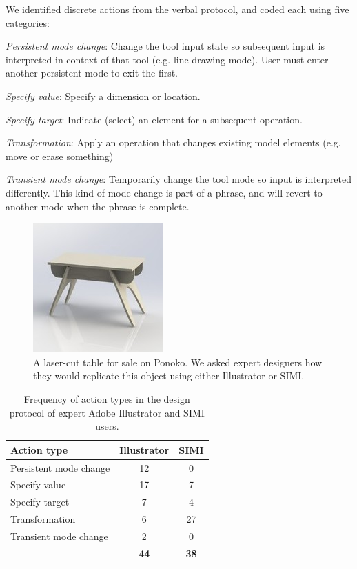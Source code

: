 \documentclass{article}
\begin{document}
We identified discrete actions from the verbal protocol, and coded
each using five categories:

\textit{Persistent mode change}: Change the tool input state so
subsequent input is interpreted in context of that tool (e.g. line
drawing mode). User must enter another persistent mode to exit the
first.

\textit{Specify value}: Specify a dimension or location.

\textit{Specify target}: Indicate (select) an element for a subsequent
operation.

\textit{Transformation}: Apply an operation that changes existing
model elements (e.g. move or erase something)

\textit{Transient mode change}: Temporarily change the tool mode so
input is interpreted differently. This kind of mode change is part of
a phrase, and will revert to another mode when the phrase is complete.

\begin{figure}[h]
  \centering
  \includegraphics[width=0.4\linewidth]{img/table.jpg}
  \caption{A laser-cut table for sale on Ponoko. We asked expert
    designers how they would replicate this object using either
    Illustrator or SIMI.}
  \label{fig:table}
\end{figure}

\begin{table}[h]
\centering
\begin{tabular}{ l c c }
\textbf{Action type} & \textbf{Illustrator} & \textbf{SIMI} \\
\hline
Persistent mode change & 12 & 0 \\
Specify value & 17 & 7 \\
Specify target & 7 & 4 \\
Transformation & 6 & 27 \\
Transient mode change & 2 & 0 \\
\hline
& \textbf{44} & \textbf{38} \\
\end{tabular}
\caption{Frequency of action types in the design protocol of expert
  Adobe Illustrator and SIMI users. }
\label{tab:expert}
\end{table}
\end{document}

